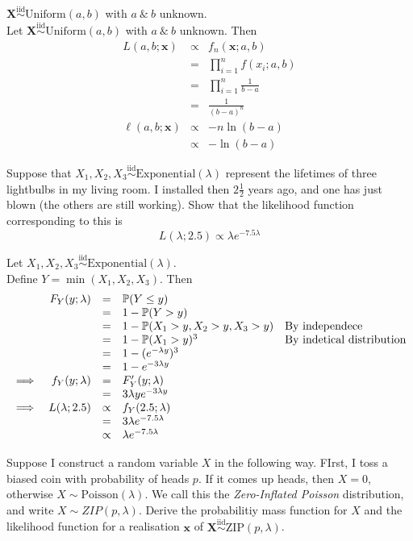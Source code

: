 \documentclass[11pt,a4paper]{article}
\begin{document}
\qpartnb $\textbf{X}\overset{\mathrm{iid}}{\sim}\mathrm{Uniform}(a,b)$ with $a\ \&\ b$ unknown.\\

\apart
Let $\textbf{X}\overset{\mathrm{iid}}{\sim}\mathrm{Uniform}(a,b)$ with $a\ \&\ b$ unknown. Then
\[\begin{array}{rcl}
L(a,b;\textbf{x})&\propto&f_n(\textbf{x};a,b)\\
&=&\prod\limits_{i=1}^nf(x_i;a,b)\\
&=&\prod\limits_{i=1}^n\frac{1}{b-a}\\
&=&\frac{1}{(b-a)^n}\\
\ell(a,b;\textbf{x})&\propto&-n\ln(b-a)\\
&\propto&-\ln(b-a)
\end{array}\]

\question
Suppose that $X_1,X_2,X_3\overset{\mathrm{iid}}{\sim}\mathrm{Exponential}(\lambda)$ represent the lifetimes of three lightbulbs in my living room. I installed then $2\frac{1}{2}$ years ago, and one has just blown (the others are still working). Show that the likelihood function corresponding to this is
$$L(\lambda;2.5)\propto\lambda e^{-7.5\lambda}$$

\ans
Let $X_1,X_2,X_3\overset{\mathrm{iid}}{\sim}\mathrm{Exponential}(\lambda)$.\\
Define $Y=\min(X_1,X_2,X_3)$. Then
\[\begin{array}{rrcll}
&F_Y(y;\lambda)&=&\mathbb{P}(Y\leq y)\\
&&=&1-\mathbb{P}(Y>y)\\
&&=&1-\mathbb{P}(X_1>y,X_2>y,X_3>y)&\text{By independece}\\
&&=&1-\mathbb{P}(X_1>y)^3&\text{By indetical distribution}\\
&&=&1-(e^{-\lambda y})^3\\
&&=&1-e^{-3\lambda y}\\
\implies&f_Y(y;\lambda)&=&F_Y'(y;\lambda)\\
&&=&3\lambda ye^{-3\lambda y}\\
\implies&L(\lambda;2.5)&\propto&f_Y(2.5;\lambda)\\
&&=&3\lambda e^{-7.5\lambda}\\
&&\propto&\lambda e^{-7.5\lambda}
\end{array}\]

\question
Suppose I construct a random variable $X$ in the following way. FIrst, I toss a biased coin with probability of heads $p$. If it comes up heads, then $X=0$, otherwise $X\sim\mathrm{Poisson}(\lambda)$. We call this the \textit{Zero-Inflated Poisson} distribution, and write $X\sim ZIP(p,\lambda)$. Derive the probabilitiy mass function for $X$ and the likelihood function for a realisation $\textbf{x}$ of $\textbf{X}\overset{\mathrm{iid}}{\sim}\mathrm{ZIP}(p,\lambda)$.\\
\end{document}
